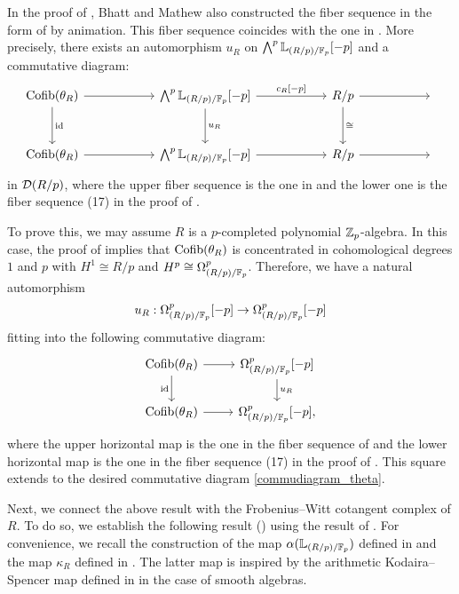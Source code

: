 \documentclass[11pt,a4paper]{amsart}
\begin{document}
\begin{remark}
    In the proof of \cite[Proposition 4.19]{bhatt2023Syntomic}, Bhatt and Mathew also constructed the fiber sequence in the form of  by animation. This fiber sequence coincides with the one in . More precisely, there exists an automorphism $u_R$ on $\bigwedge^p\mathbb{L}_{(R/p)/\mathbb{F}_p}[-p]$ and a commutative diagram:
    \begin{equation} \label{commudiagram_theta}
        \begin{tikzcd}[column sep=2cm, row sep=1cm]
        \Cofib(\theta_R) \arrow[r] \arrow[d, "\id"] & \bigwedge^p\Cot_{(R/p)/\setF_p}[-p] \arrow[r,"{c_R[-p]}"] \arrow[d,"u_R"] & R/p \arrow[r] \arrow[d,"\cong"] & {} \\
        \Cofib(\theta_R) \arrow[r] & \bigwedge^p\Cot_{(R/p)/\setF_p}[-p] \arrow[r,""] & R/p \arrow[r] & {}
        \end{tikzcd}
    \end{equation} 
    in $\mathcal{D}(R/p)$,
where the upper fiber sequence is the one in  and the lower one is the fiber sequence (17) in the proof of \cite[Proposition 4.19]{bhatt2023Syntomic}.

To prove this, we may assume $R$ is a \(p\)-completed polynomial $\mathbb{Z}_p$-algebra. In this case, the proof of \cite[Proposition 4.19]{bhatt2023Syntomic} implies that $\operatorname{Cofib}(\theta_R)$ is concentrated in cohomological degrees $1$ and $p$ with $H^1\cong R/p$ and $H^p\cong \Omega^p_{(R/p)/\mathbb{F}_p}$. Therefore, we have a natural automorphism 
\[u_R:\Omega^p_{(R/p)/\mathbb{F}_p}[-p]\to \Omega^p_{(R/p)/\mathbb{F}_p}[-p]\] fitting into the following commutative diagram:
\[ \begin{tikzcd} \Cofib(\theta_R) \arrow[r, ""] \arrow[d, "\id"'] & \Omega^p_{(R/p)/\setF_p}[-p] \arrow[d, "u_R"] \\ \Cofib(\theta_R)  \arrow[r, ""'] & \Omega^p_{(R/p)/\setF_p}[-p], \end{tikzcd} \] where the upper horizontal map is the one in the fiber sequence of  and the lower horizontal map is the one in the fiber sequence (17) in the proof of \cite[Proposition 4.19]{bhatt2023Syntomic}. This square extends to the desired commutative diagram \eqref{commudiagram_theta}.
\end{remark}


Next, we connect the above result with the Frobenius--Witt cotangent complex of $R$. To do so, we establish the following result () using the result of \cite{petrov2025Nondecomposability}. For convenience, we recall the construction of the map $\alpha(\mathbb{L}_{(R/p)/\mathbb{F}_p})$ defined in \cite{petrov2025Nondecomposability} and the map $\kappa_R$ defined in \cite{shimada2026Arithmetic}.
The latter map is inspired by the arithmetic Kodaira--Spencer map defined in \cite{dupuy2019Total} in the case of smooth algebras.
\end{document}
